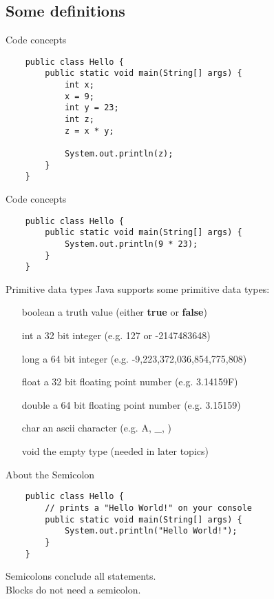\subsection{Some definitions}

\begin{frame}[fragile]{Code concepts}
    \begin{lstlisting}
    public class Hello {
        public static void main(String[] args) {            
            int x;
            x = 9;
            int y = 23;
            int z;
            z = x * y;
            
            System.out.println(z);
        }
    }\end{lstlisting}
\end{frame}

\begin{frame}[fragile]{Code concepts}
    \begin{lstlisting}
    public class Hello {
        public static void main(String[] args) {
            System.out.println(9 * 23);
        }
    }\end{lstlisting}
\end{frame}

\begin{frame}{Primitive data types}
    Java supports some primitive data types:
    \begin{itemize}
        \item[boolean] a truth value (either \textbf{true} or \textbf{false})
        \item[int] a 32 bit integer (e.g. 127 or -2147483648)
        \item[long] a 64 bit integer (e.g. -9,223,372,036,854,775,808)
        \item[float] a 32 bit floating point number (e.g. 3.14159F)
        \item[double] a 64 bit floating point number (e.g. 3.15159)
        \item[char] an ascii character (e.g. \textquotesingle A\textquotesingle, \textquotesingle \_\textquotesingle, \textquotesingle \enspace\textquotesingle)
        \item[void] the empty type (needed in later topics)
    \end{itemize}
\end{frame}

\begin{frame}[fragile]{About the Semicolon}
    \begin{lstlisting}
    public class Hello {
        // prints a "Hello World!" on your console
        public static void main(String[] args) {
            System.out.println("Hello World!");
        }
    }\end{lstlisting}
    Semicolons conclude all statements. \\
    Blocks do not need a semicolon.
\end{frame}

